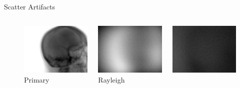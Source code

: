 \begin{frame}[c]{Scatter Artifacts}
	\begin{figure}[]
		\centering
		\begin{columns}[t, onlytextwidth]
			\begin{column}{0.25\textwidth}
				\centering{}
				\includegraphics[width=0.8\linewidth]{images/scatter_primary.png}\\
				Primary
			\end{column}\begin{column}{0.25\textwidth}
				\centering{}
				\includegraphics[width=0.8\linewidth]{images/scatter_rayleigh.png}\\
				Rayleigh
			\end{column}\begin{column}{0.25\textwidth}
				\centering{}
				\includegraphics[width=0.8\linewidth]{images/scatter_compton.png}\\

\end{column}
\end{columns}
\end{figure}
\end{frame}
